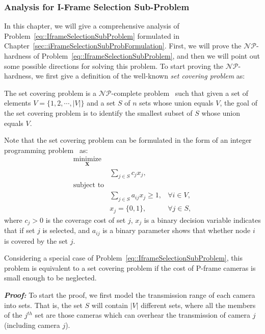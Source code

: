 \subsubsection{Analysis for I-Frame Selection Sub-Problem}
In this chapter, we will give a comprehensive analysis of Problem~\eqref{eq::IframeSelectionSubProblem} formulated in Chapter~\ref{sec::iFrameSelectionSubProbFormulation}.
First, we will prove the $\mathcal{NP}$-hardness of Problem~\eqref{eq::IframeSelectionSubProblem}, and then we will point out some possible directions for solving this problem.
To start proving the $\mathcal{NP}$-hardness, we first give a definition of the well-known \emph{set covering problem} as:
\begin{mydef}
The set covering problem is a $\mathcal{NP}$-complete problem~\cite{SetCoveringNPComplete} such that given a set of elements $V = \{1,2,\cdots,|V|\}$ and a set $S$ of $n$ sets whose union equals $V$, the goal of the set covering problem is to identify the smallest subset of $S$ whose union equals $V$.
\label{def::SCP}
\end{mydef}
Note that the set covering problem can be formulated in the form of an integer programming problem~\cite{SetCoveringFormulation} as:
\begin{align}
\underset{\mathbf{X}}{\text{minimize}} & & \nonumber \\
 &\sum_{j \in S} c_j x_j, & \nonumber \\
\text{subject to} & & \nonumber \\
 &\sum_{j \in S} a_{ij}x_j \geq 1, &\forall i \in V, \nonumber \\
 &x_{j} = \{0,1\}, &\forall j \in S,
\label{eq::SetCoveringProblemFormualtion}
\end{align}
where $c_j > 0$ is the coverage cost of set $j$, $x_j$ is a binary decision variable indicates that if set $j$ is selected, and $a_{ij}$ is a binary parameter shows that whether node $i$ is covered by the set $j$.
\begin{mylem}
Considering a special case of Problem~\eqref{eq::IframeSelectionSubProblem}, this problem is equivalent to a set covering problem if the cost of P-frame cameras is small enough to be neglected.
\label{lemma::ReduceProb}
\end{mylem}
\textbf{\emph{Proof:}}
To start the proof, we first model the transmission range of each camera into sets.
That is, the set $S$ will contain $|V|$ different sets, where all the members of the $j^{th}$ set are those cameras which can overhear the transmission of camera $j$ (including camera $j$).
